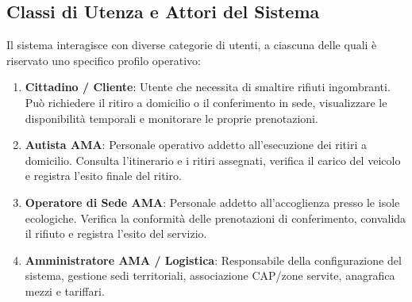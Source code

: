 \subsection{Classi di Utenza e Attori del Sistema}
Il sistema interagisce con diverse categorie di utenti, a ciascuna delle quali è riservato uno specifico profilo operativo:
\begin{enumerate}
    \item \textbf{Cittadino / Cliente}: Utente che necessita di smaltire rifiuti ingombranti. Può richiedere il ritiro a domicilio o il conferimento in sede, visualizzare le disponibilità temporali e monitorare le proprie prenotazioni.
    \item \textbf{Autista AMA}: Personale operativo addetto all'esecuzione dei ritiri a domicilio. Consulta l'itinerario e i ritiri assegnati, verifica il carico del veicolo e registra l'esito finale del ritiro.
    \item \textbf{Operatore di Sede AMA}: Personale addetto all'accoglienza presso le isole ecologiche. Verifica la conformità delle prenotazioni di conferimento, convalida il rifiuto e registra l'esito del servizio.
    \item \textbf{Amministratore AMA / Logistica}: Responsabile della configurazione del sistema, gestione sedi territoriali, associazione CAP/zone servite, anagrafica mezzi e tariffari.
\end{enumerate}

